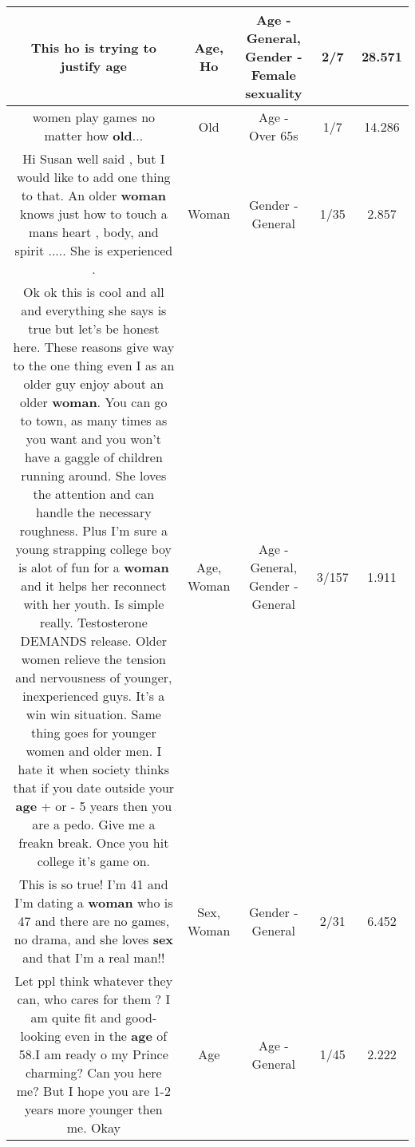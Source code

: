 \documentclass[11pt]{article}
\newlength\mylength
\begin{document}
\begin{center}
\begin{longtable}{|C{.65\mylength}|C{.30\mylength}|C{.12\mylength}|C{.12\mylength}|C{.12\mylength}|}
  \small This \textbf{ho} is trying to justify age\normalsize   & Age, Ho & Age - General, Gender - Female sexuality & 2/7 & 28.571 \\  \hline
  \small women play games no matter how \textbf{old}...\normalsize   & Old & Age - Over 65s & 1/7 & 14.286 \\  \hline
  \small Hi Susan well said , but I would like to add one thing to that. An older \textbf{woman} knows just how to touch a mans heart , body, and spirit ..... She is experienced .\normalsize   & Woman & Gender - General & 1/35 & 2.857 \\  \hline
  \small Ok ok this is cool and all and everything she says is true but let's be honest here. These reasons give way to the one thing even I as an older guy enjoy about an older \textbf{woman}. You can go to town, as many times as you want and you won't have a gaggle of children running around. She loves the attention and can handle the necessary roughness. Plus I'm sure a young strapping college boy is alot of fun for a \textbf{woman} and it helps her reconnect with her youth. Is simple really. Testosterone DEMANDS release. Older women relieve the tension and nervousness of younger, inexperienced guys. It's a win win situation. Same thing goes for younger women and older men. I hate it when society thinks that if you date outside your \textbf{age} + or - 5 years then you are a pedo. Give me a freakn break. Once you hit college it's game on.\normalsize   & Age, Woman & Age - General, Gender - General & 3/157 & 1.911 \\  \hline
  \small This is so true! I'm 41 and I'm dating a \textbf{woman} who is 47 and there are no games, no drama, and she loves \textbf{sex} and that I'm a real man!!\normalsize   & Sex, Woman & Gender - General & 2/31 & 6.452 \\  \hline
  \small Let ppl think whatever they can, who cares for them ?  I am quite fit and good-looking even in the \textbf{age} of 58.I am ready o my Prince charming? Can you here me? But I hope you are 1-2 years more younger then me. Okay\normalsize   & Age & Age - General & 1/45 & 2.222 \\  \hline

\end{longtable}
\end{center}
\end{document}
